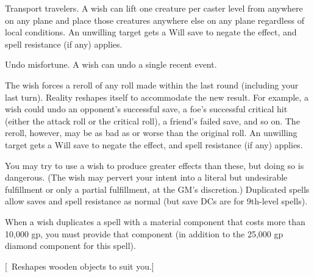 { Transport travelers. A wish can lift one creature per caster level from anywhere on any plane and place those creatures anywhere else on any plane regardless of local conditions. An unwilling target gets a Will save to negate the effect, and spell resistance (if any) applies.

 Undo misfortune. A wish can undo a single recent event.

The wish forces a reroll of any roll made within the last round (including your last turn). Reality reshapes itself to accommodate the new result. For example, a wish could undo an opponent's successful save, a foe's successful critical hit (either the attack roll or the critical roll), a friend's failed save, and so on. The reroll, however, may be as bad as or worse than the original roll. An unwilling target gets a Will save to negate the effect, and spell resistance (if any) applies.

You may try to use a wish to produce greater effects than these, but doing so is dangerous. (The wish may pervert your intent into a literal but undesirable fulfillment or only a partial fulfillment, at the GM's discretion.) Duplicated spells allow saves and spell resistance as normal (but save DCs are for 9th-level spells).

When a wish duplicates a spell with a material component that costs more than 10,000 gp, you must provide that component (in addition to the 25,000 gp diamond component for this spell).}
        
[ Reshapes wooden objects to suit you.]
        
